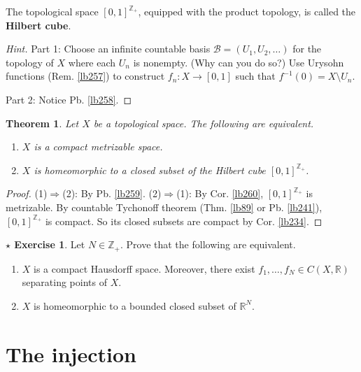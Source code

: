 \documentclass[12pt,b5paper,notitlepage]{article}
\theoremstyle{definition}
\newtheorem{sexe}[df]{$\star$ Exercise}
\theoremstyle{plain}
\newtheorem{thm}[df]{Theorem}
\newcommand{\mc}{\mathcal}
\newcommand{\Zbb}{\mathbb Z}
\newcommand{\Rbb}{\mathbb R}
\numberwithin{equation}{section}
\begin{document}
The topological space $[0,1]^{\Zbb_+}$, equipped with the product topology, is called the \textbf{Hilbert cube}. 




\begin{proof}[Hint]
Part 1: Choose an infinite countable basis $\mc B=(U_1,U_2,\dots)$ for the topology of $X$ where each $U_n$ is nonempty. (Why can you do so?) Use Urysohn functions (Rem. \ref{lb257}) to construct $f_n:X\rightarrow [0,1]$ such that $f^{-1}(0)=X\setminus U_n$.

Part 2: Notice Pb. \ref{lb258}.
\end{proof}


\begin{thm}\label{lb261}
Let $X$ be a topological space. The following are equivalent.
\begin{enumerate}[label=(\arabic*)]
\item $X$ is a compact metrizable space.
\item $X$ is homeomorphic to a closed subset of the Hilbert cube $[0,1]^{\Zbb_+}$.
\end{enumerate}
\end{thm}

\begin{proof}
(1)$\Rightarrow$(2): By Pb. \ref{lb259}. (2)$\Rightarrow$(1): By Cor. \ref{lb260}, $[0,1]^{\Zbb_+}$ is metrizable. By countable Tychonoff theorem (Thm. \ref{lb89} or Pb. \ref{lb241}), $[0,1]^{\Zbb_+}$ is compact. So its closed subsets are compact by Cor. \ref{lb234}.
\end{proof}



\begin{sexe}
Let $N\in\Zbb_+$. Prove that the following are equivalent.
\begin{enumerate}[label=(\arabic*)]
\item $X$ is a compact Hausdorff space. Moreover, there exist $f_1,\dots,f_N\in C(X,\Rbb)$ separating points of $X$.
\item $X$ is homeomorphic to a bounded closed subset of $\Rbb^N$.
\end{enumerate}
\end{sexe}


\newpage

\section{The injection \pmb{$\Psi:C(X,C(Y,\mc V))\rightarrow C(X\times Y,\mc V)$}}\label{lb352}
\end{document}
